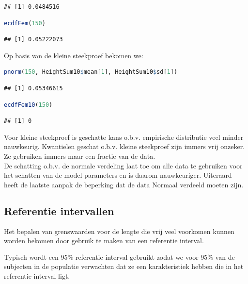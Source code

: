 \documentclass[
  12pt,dutch,coursenotes]{book}
\theoremstyle{definition}
\theoremstyle{definition}
\theoremstyle{definition}
\theoremstyle{definition}
\theoremstyle{remark}
\begin{document}
\begin{lstlisting}
## [1] 0.0484516
\end{lstlisting}

\begin{lstlisting}[language=R]
ecdfFem(150)
\end{lstlisting}

\begin{lstlisting}
## [1] 0.05222073
\end{lstlisting}

Op basis van de kleine steekproef bekomen we:

\begin{lstlisting}[language=R]
pnorm(150, HeightSum10$mean[1], HeightSum10$sd[1])
\end{lstlisting}

\begin{lstlisting}
## [1] 0.05346615
\end{lstlisting}

\begin{lstlisting}[language=R]
ecdfFem10(150)
\end{lstlisting}

\begin{lstlisting}
## [1] 0
\end{lstlisting}

Voor kleine steekproef is geschatte kans o.b.v. empirische distributie veel minder nauwkeurig.
Kwantielen geschat o.b.v. kleine steekproef zijn immers vrij onzeker. Ze gebruiken immers maar een fractie van de data.\\
De schatting o.b.v. de normale verdeling laat toe om alle data te gebruiken voor het schatten van de model parameters en is daarom nauwkeuriger. Uiteraard heeft de laatste aanpak de beperking dat de data Normaal verdeeld moeten zijn.

\hypertarget{referentie-intervallen}{%
\subsection{Referentie intervallen}\label{referentie-intervallen}}

Het bepalen van grenswaarden voor de lengte die vrij veel voorkomen kunnen worden bekomen door gebruik te maken van een referentie interval.

Typisch wordt een 95\% referentie interval gebruikt zodat we voor 95\% van de subjecten in de populatie verwachten dat ze een karakteristiek hebben die in het referentie interval ligt.
\end{document}
